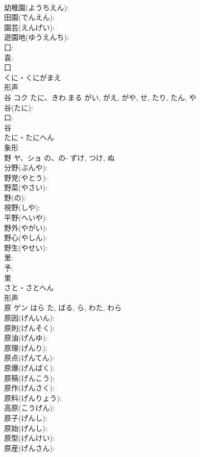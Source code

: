\documentclass[8pt]{extreport}
\begin{document}
\begin{CJK}{UTF8}{min}
\\	幼稚園(ようちえん): 
\\	田園(でんえん): 
\\	園芸(えんげい): 
\\	遊園地(ゆうえんち): 
\\	囗: 
\\	袁: 
\\	囗	
\\	くに・くにがまえ	
\\	形声 
\\	谷	コク	たに、きわ.まる	がい, がえ, がや, せ, たり, たん, や	
\\	谷(たに): 
\\	口: 
\\	谷	
\\	たに・たにへん	
\\	象形 
\\	野	ヤ、ショ	の、の-	ずけ, つけ, ぬ	
\\	分野(ぶんや): 
\\	野党(やとう): 
\\	野菜(やさい): 
\\	野(の): 
\\	視野(しや): 
\\	平野(へいや): 
\\	野外(やがい): 
\\	野心(やしん): 
\\	野生(やせい): 
\\	里: 
\\	予: 
\\	里	
\\	さと・さとへん	
\\	形声 
\\	原	ゲン	はら	た, ばる, ら, わた, わら	
\\	原因(げんいん): 
\\	原則(げんそく): 
\\	原油(げんゆ): 
\\	原理(げんり): 
\\	原点(げんてん): 
\\	原爆(げんばく): 
\\	原稿(げんこう): 
\\	原作(げんさく): 
\\	原料(げんりょう): 
\\	高原(こうげん): 
\\	原子(げんし): 
\\	原始(げんし): 
\\	原型(げんけい): 
\\	原産(げんさん): 

\end{CJK}
\end{document}
